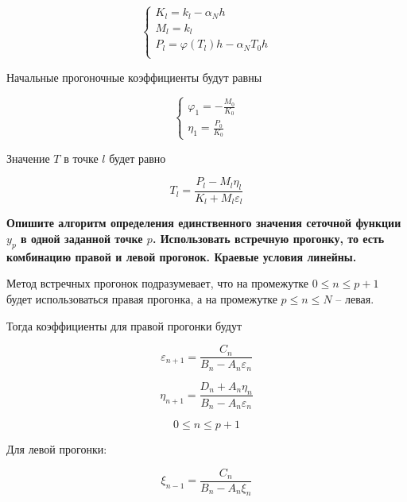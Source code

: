 \begin{equation*}
    \begin{cases}
        K_l = k_l - \alpha_Nh \\
        M_l = k_l \\
        P_l = \varphi(T_l)h - \alpha_NT_0h \\
    \end{cases}
\end{equation*}

Начальные прогоночные коэффициенты будут равны

\begin{equation*}
    \begin{cases}
        \varphi_1 = -\frac{M_0}{K_0} \\
        \eta_1 = \frac{P_0}{K_0}
    \end{cases}
\end{equation*}

Значение $T$ в точке $l$ будет равно

\begin{equation*}
    T_l = \frac{P_l - M_l \eta_l}{K_l + M_l \varepsilon_l}
\end{equation*}

\textbf{Опишите алгоритм определения единственного значения сеточной функции $y_p$ в одной заданной точке $p$. Использовать встречную прогонку, то есть комбинацию правой и левой прогонок. Краевые условия линейны.}


Метод встречных прогонок подразумевает, что на промежутке $0 \le n \le p + 1$ будет использоваться правая прогонка, а на промежутке $p \le n \le N$ -- левая.

Тогда коэффициенты для правой прогонки будут

\begin{equation*}
    \varepsilon_{n+1} = \frac{C_n}{B_n-A_n\varepsilon_n}
\end{equation*}

\begin{equation*}
    \eta_{n+1} = \frac{D_n + A_n \eta_n}{B_n - A_n \varepsilon_n}
\end{equation*}

\begin{equation*}
    0 \le n \le p+1
\end{equation*}

Для левой прогонки:

\begin{equation*}
    \xi_{n-1} = \frac{C_n}{B_n - A_n \xi_n}
\end{equation*}

